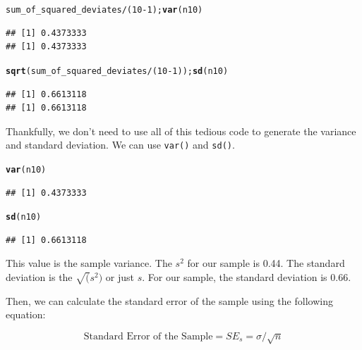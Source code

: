 \documentclass{tufte-handout}\usepackage[]{graphicx}\usepackage[]{color}
\makeatletter
\newcommand{\hlnum}[1]{\textcolor[rgb]{0.686,0.059,0.569}{#1}}%
\newcommand{\hlopt}[1]{\textcolor[rgb]{0,0,0}{#1}}%
\newcommand{\hlstd}[1]{\textcolor[rgb]{0.345,0.345,0.345}{#1}}%
\newcommand{\hlkwd}[1]{\textcolor[rgb]{0.737,0.353,0.396}{\textbf{#1}}}%
\newenvironment{kframe}{%
 \def\at@end@of@kframe{}%
 \ifinner\ifhmode%
  \def\at@end@of@kframe{\end{minipage}}%
  \begin{minipage}{\columnwidth}%
 \fi\fi%
 \def\FrameCommand##1{\hskip\@totalleftmargin \hskip-\fboxsep
 \colorbox{shadecolor}{##1}\hskip-\fboxsep
     \hskip-\linewidth \hskip-\@totalleftmargin \hskip\columnwidth}%
 \MakeFramed {\advance\hsize-\width
   \@totalleftmargin\z@ \linewidth\hsize
   \@setminipage}}%
 {\par\unskip\endMakeFramed%
 \at@end@of@kframe}
\newenvironment{knitrout}{}{} %
\makeatother
\begin{document}
\begin{knitrout}
\color{fgcolor}\begin{kframe}
\begin{alltt}
\hlstd{sum_of_squared_deviates}\hlopt{/}\hlstd{(}\hlnum{10}\hlopt{-}\hlnum{1}\hlstd{);} \hlkwd{var}\hlstd{(n10)}
\end{alltt}
\begin{verbatim}
## [1] 0.4373333
## [1] 0.4373333
\end{verbatim}
\begin{alltt}
\hlkwd{sqrt}\hlstd{(sum_of_squared_deviates}\hlopt{/}\hlstd{(}\hlnum{10}\hlopt{-}\hlnum{1}\hlstd{));} \hlkwd{sd}\hlstd{(n10)}
\end{alltt}
\begin{verbatim}
## [1] 0.6613118
## [1] 0.6613118
\end{verbatim}
\end{kframe}
\end{knitrout}
\noindent Thankfully, we don't need to use all of this tedious code to generate the variance and standard deviation. We can use \texttt{var()} and \texttt{sd()}. 
\begin{knitrout}
\color{fgcolor}\begin{kframe}
\begin{alltt}
\hlkwd{var}\hlstd{(n10)}
\end{alltt}
\begin{verbatim}
## [1] 0.4373333
\end{verbatim}
\begin{alltt}
\hlkwd{sd}\hlstd{(n10)}
\end{alltt}
\begin{verbatim}
## [1] 0.6613118
\end{verbatim}
\end{kframe}
\end{knitrout}

\noindent This value is the sample variance. 
The $s^2$ for our sample is 0.44. The standard deviation is the $\sqrt(s^2)$ or just $s$. For our sample, the standard deviation is 0.66. 

Then, we can calculate the standard error of the sample using the following equation: 

\begin{equation}
\textrm{Standard Error of the Sample} = SE_s = \sigma/\sqrt{n}
\end{equation}
\end{document}

